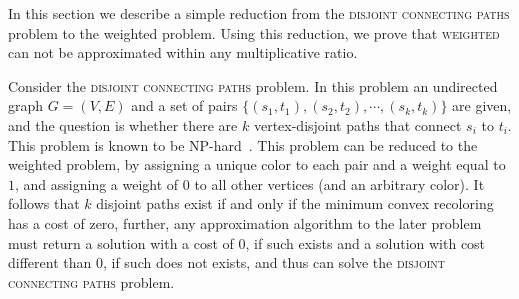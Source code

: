 \label{sec:hard}
In this section we describe a simple reduction from the 
\textsc{disjoint connecting paths} problem to the weighted \TWOCR{} problem.
Using this reduction, we prove that \textsc{weighted \TWOCR{}} can not be approximated
within any multiplicative ratio.
 
Consider the \textsc{disjoint connecting paths} problem.
In this problem an undirected graph $G=(V,E)$ and a set of 
pairs $\{(s_1, t_1), (s_2, t_2), \cdots, (s_k, t_k)\}$ are given, 
and the question is whether there are $k$ vertex-disjoint paths that connect $s_i$ to $t_i$.
This problem is known to be NP-hard~\cite{karp1972reducibility}.
This problem can be reduced to the weighted \TWOCR{} problem,
by assigning a unique color to each pair and a weight equal to $1$, 
and assigning a weight of $0$ to all other vertices (and an arbitrary color).
It follows that $k$ disjoint paths exist if and only if the minimum convex recoloring has
a cost of zero, further, 
any approximation algorithm to the later problem must return a solution with a cost of $0$,
if such exists and a solution with cost different than $0$, if such does not exists, 
and thus can solve the \textsc{disjoint connecting paths} problem.
